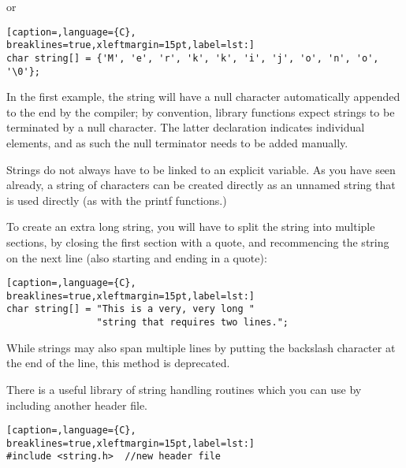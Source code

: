 or
\lstset{basicstyle=\scriptsize, numbers=left, captionpos=b, tabsize=4}
\begin{lstlisting}[caption=,language={C},
breaklines=true,xleftmargin=15pt,label=lst:]
char string[] = {'M', 'e', 'r', 'k', 'k', 'i', 'j', 'o', 'n', 'o', '\0'};
\end{lstlisting}

In the first example, the string will have a null character automatically
appended to the end by the compiler; by convention, library functions expect
strings to be terminated by a null character. The latter declaration indicates
individual elements, and as such the null terminator needs to be added
manually. 

Strings do not always have to be linked to an explicit variable. As you have
seen already, a string of characters can be created directly as an unnamed
string that is used directly (as with the printf functions.) 

To create an extra long string, you will have to split the string into multiple
sections, by closing the first section with a quote, and recommencing the
string on the next line (also starting and ending in a quote):
\lstset{basicstyle=\scriptsize, numbers=left, captionpos=b, tabsize=4}
\begin{lstlisting}[caption=,language={C},
breaklines=true,xleftmargin=15pt,label=lst:]
char string[] = "This is a very, very long "
                "string that requires two lines.";
\end{lstlisting}

While strings may also span multiple lines by putting the backslash character
at the end of the line, this method is deprecated. 

There is a useful library of string handling routines which you can use by
including another header file.
\lstset{basicstyle=\scriptsize, numbers=left, captionpos=b, tabsize=4}
\begin{lstlisting}[caption=,language={C},
breaklines=true,xleftmargin=15pt,label=lst:]
#include <string.h>  //new header file
\end{lstlisting}
